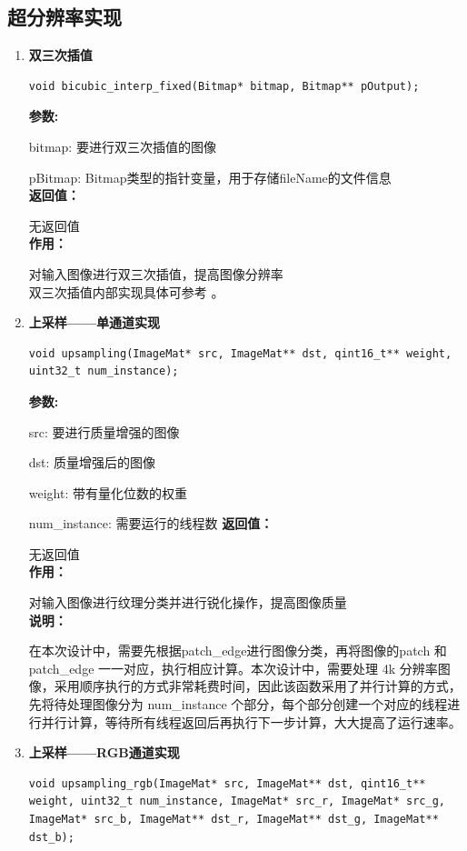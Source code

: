\documentclass[12pt, a4paper, oneside]{ctexbook}
\begin{document}
		\subsection{超分辨率实现}
		\begin{enumerate}
			\item \textbf{双三次插值}
			\begin{lstlisting}[numbers=none]
				void bicubic_interp_fixed(Bitmap* bitmap, Bitmap** pOutput);
			\end{lstlisting}
			\textbf{参数:} \par bitmap: 要进行双三次插值的图像 \par pBitmap: Bitmap类型的指针变量，用于存储fileName的文件信息 \\
			\textbf{返回值：}\par 无返回值\\
			\textbf{作用：}\par 对输入图像进行双三次插值，提高图像分辨率\\
			双三次插值内部实现具体可参考 \textbf{}。
			
			\item \textbf{上采样——单通道实现}
			\begin{lstlisting}[numbers=none]
void upsampling(ImageMat* src, ImageMat** dst, qint16_t** weight, uint32_t num_instance);			
			\end{lstlisting}
			\textbf{参数:} \par src: 要进行质量增强的图像 \par dst: 质量增强后的图像\par weight: 带有量化位数的权重\par num\_instance: 需要运行的线程数
			\textbf{返回值：}\par 无返回值\\
			\textbf{作用：}\par 对输入图像进行纹理分类并进行锐化操作，提高图像质量\\
			\textbf{说明：}\par 在本次设计中，需要先根据patch\_edge进行图像分类，再将图像的patch 和 patch\_edge 一一对应，执行相应计算。本次设计中，需要处理 4k 分辨率图像，采用顺序执行的方式非常耗费时间，因此该函数采用了并行计算的方式，先将待处理图像分为 num\_instance 个部分，每个部分创建一个对应的线程进行并行计算，等待所有线程返回后再执行下一步计算，大大提高了运行速率。
			
			\item \textbf{上采样——RGB通道实现}
			\begin{lstlisting}[numbers=none]
void upsampling_rgb(ImageMat* src, ImageMat** dst, qint16_t** weight, uint32_t num_instance, ImageMat* src_r, ImageMat* src_g, ImageMat* src_b, ImageMat** dst_r, ImageMat** dst_g, ImageMat** dst_b);
			\end{lstlisting}
			

\end{enumerate}
\end{document}
